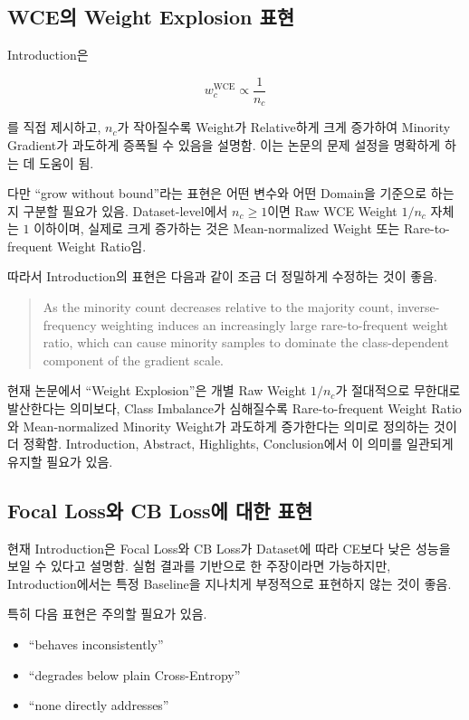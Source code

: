 \documentclass[11pt,a4paper]{article}
\begin{document}
\subsection{WCE의 Weight Explosion 표현}

Introduction은

\[
w_c^{\mathrm{WCE}}\propto \frac{1}{n_c}
\]

를 직접 제시하고, \(n_c\)가 작아질수록 Weight가 Relative하게 크게 증가하여 Minority Gradient가 과도하게 증폭될 수 있음을 설명함. 이는 논문의 문제 설정을 명확하게 하는 데 도움이 됨.

다만 ``grow without bound''라는 표현은 어떤 변수와 어떤 Domain을 기준으로 하는지 구분할 필요가 있음. Dataset-level에서 \(n_c\geq 1\)이면 Raw WCE Weight \(1/n_c\) 자체는 \(1\) 이하이며, 실제로 크게 증가하는 것은 Mean-normalized Weight 또는 Rare-to-frequent Weight Ratio임.

따라서 Introduction의 표현은 다음과 같이 조금 더 정밀하게 수정하는 것이 좋음.

\begin{quote}
As the minority count decreases relative to the majority count, inverse-frequency weighting induces an increasingly large rare-to-frequent weight ratio, which can cause minority samples to dominate the class-dependent component of the gradient scale.
\end{quote}

\begin{tcolorbox}[title=중요]
현재 논문에서 ``Weight Explosion''은 개별 Raw Weight \(1/n_c\)가 절대적으로 무한대로 발산한다는 의미보다, Class Imbalance가 심해질수록 Rare-to-frequent Weight Ratio와 Mean-normalized Minority Weight가 과도하게 증가한다는 의미로 정의하는 것이 더 정확함. Introduction, Abstract, Highlights, Conclusion에서 이 의미를 일관되게 유지할 필요가 있음.
\end{tcolorbox}

\subsection{Focal Loss와 CB Loss에 대한 표현}

현재 Introduction은 Focal Loss와 CB Loss가 Dataset에 따라 CE보다 낮은 성능을 보일 수 있다고 설명함. 실험 결과를 기반으로 한 주장이라면 가능하지만, Introduction에서는 특정 Baseline을 지나치게 부정적으로 표현하지 않는 것이 좋음.

특히 다음 표현은 주의할 필요가 있음.

\begin{itemize}
\item ``behaves inconsistently''
\item ``degrades below plain Cross-Entropy''
\item ``none directly addresses''
\end{itemize}
\end{document}
